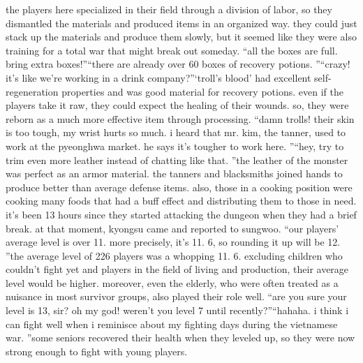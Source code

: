 the players here specialized in their field through a division of labor, so they dismantled the materials and produced items in an organized way.
they could just stack up the materials and produce them slowly, but it seemed like they were also training for a total war that might break out someday.
“all the boxes are full.
 bring extra boxes!”“there are already over 60 boxes of recovery potions.
”“crazy! it’s like we’re working in a drink company?”‘troll’s blood’ had excellent self-regeneration properties and was good material for recovery potions.
even if the players take it raw, they could expect the healing of their wounds.
 so, they were reborn as a much more effective item through processing.
“damn trolls! their skin is too tough, my wrist hurts so much.
 i heard that mr.
 kim, the tanner, used to work at the pyeonghwa market.
 he says it’s tougher to work here.
”“hey, try to trim even more leather instead of chatting like that.
”the leather of the monster was perfect as an armor material.
 the tanners and blacksmiths joined hands to produce better than average defense items.
also, those in a cooking position were cooking many foods that had a buff effect and distributing them to those in need.
it’s been 13 hours since they started attacking the dungeon when they had a brief break.
at that moment, kyongsu came and reported to sungwoo.
“our players’ average level is over 11.
 more precisely, it’s 11.
6, so rounding it up will be 12.
”the average level of 226 players was a whopping 11.
6.
 excluding children who couldn’t fight yet and players in the field of living and production, their average level would be higher.
moreover, even the elderly, who were often treated as a nuisance in most survivor groups, also played their role well.
“are you sure your level is 13, sir? oh my god! weren’t you level 7 until recently?”“hahaha.
 i think i can fight well when i reminisce about my fighting days during the vietnamese war.
”some seniors recovered their health when they leveled up, so they were now strong enough to fight with young players.


 